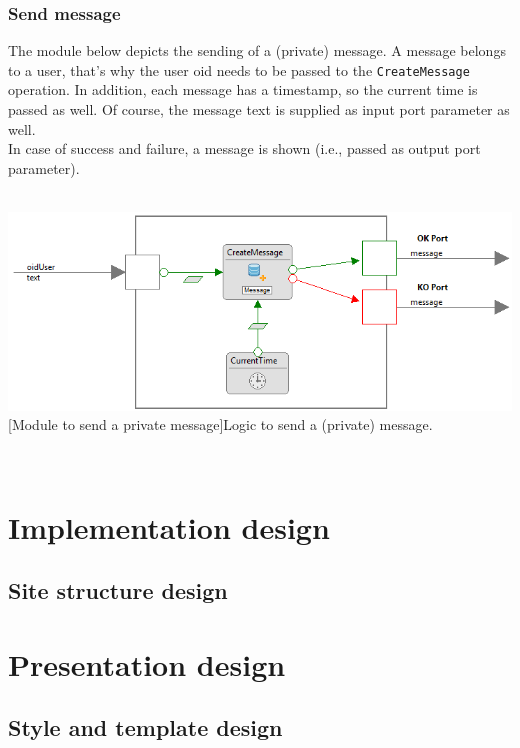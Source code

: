 \documentclass[11pt, a4paper,svglistings,oneside]{book}
\begin{document}
\subsection{Send message}

The module below depicts the sending of a (private) message. A message belongs to a user, that's why the user oid needs to be passed to the \texttt{CreateMessage} operation. In addition, each message has a timestamp, so the current time is passed as well. Of course, the message text is supplied as input port parameter as well. \\
In case of success and failure, a message is shown (i.e., passed as output port parameter).
$\;$ \\ \\
\noindent\begin{minipage}{\textwidth}
    \centering
   \includegraphics[width=1.1\textwidth]{Module_SendMessage.png}
 [Module to send a private message]{Logic to send a (private) message.}
\end{minipage}
$\;$ \\ 

\chapter{Implementation design}


\section{Site structure design}
\label{sec:sitestructure}


\chapter{Presentation design}

\section{Style and template design}



\newpage



\end{document}
